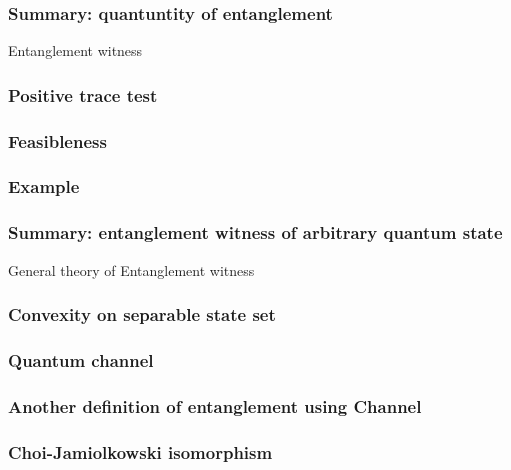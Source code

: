 \documentclass[9pt]{beamer}
\begin{document}
    \begin{frame}
        \frametitle{Summary: quantuntity of entanglement}
        
    \end{frame}

    \begin{section}{Entanglement witness}
        \begin{frame}
            \frametitle{Positive trace test}
            
        \end{frame}
        
        \begin{frame}
            \frametitle{Feasibleness}
            
        \end{frame}
        
        \begin{frame}
            \frametitle{Example}
            
        \end{frame}
    \end{section}

    \begin{frame}
        \frametitle{Summary: entanglement witness of arbitrary quantum state}
        
    \end{frame}

    \begin{section}{General theory of  Entanglement witness}
        \begin{frame}
            \frametitle{Convexity on separable state set}
            
        \end{frame}
        
        \begin{frame}
            \frametitle{Quantum channel}
            
        \end{frame}

        \begin{frame}
            \frametitle{Another definition of entanglement using Channel}
            
        \end{frame}

        \begin{frame}
            \frametitle{Choi-Jamiolkowski isomorphism}
            
        \end{frame}
    \end{section}
\end{document}
